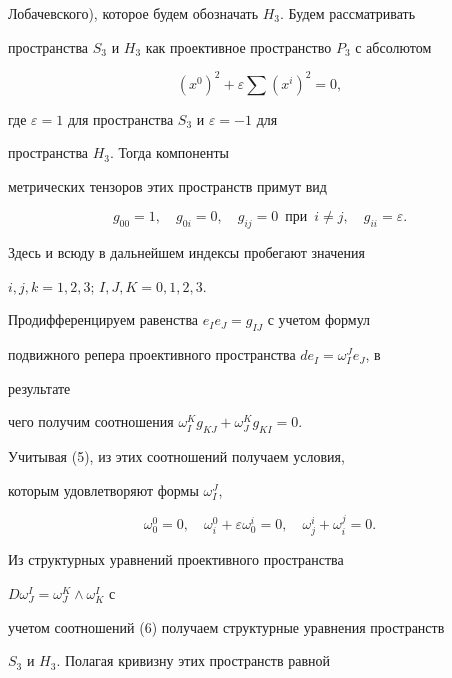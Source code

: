 Лобачевского), которое будем обозначать $H_3$. Будем рассматривать 


пространства $S_3$ и $H_3$ как проективное пространство $P_3$ с абсолютом 


$$ 


(x^0)^2+\varepsilon\sum(x^i)^2=0, 


$$ 


где $\varepsilon=1$ для пространства $S_3$ и $\varepsilon=-1$ для 


пространства $H_3$. Тогда компоненты 


метрических тензоров этих пространств примут вид


\begin{equation} 


g_{00}=1,\quad g_{0i}=0,\quad 


g_{i j}=0\ \;\text{при}\ \; i\ne j,\quad 


g_{i i}=\varepsilon. 


\end{equation} 


Здесь и всюду в дальнейшем индексы пробегают значения


$i,j,k=1,2,3$; $I,J,K=0,1,2,3$. 


 


Продифференцируем равенства $e_I e_J=g_{I J}$ с учетом формул 


подвижного репера проективного пространства $d e_I=\omega^J_I e_J$, в 


результате 


чего получим соотношения $\omega^K_I g_{K J}+\omega^K_J g_{K I}=0$.


Учитывая (5), из этих соотношений получаем условия, 


которым удовлетворяют формы $\omega^J_I$,


\begin{equation} 


\omega^0_0=0,\quad \omega^0_i+\varepsilon\omega^i_0=0, 


\quad \omega^i_j+\omega^j_i=0. 


\end{equation} 


Из структурных уравнений проективного пространства 


$D\omega^I_J=\omega^K_J\wedge\omega^I_K$ с 


учетом соотношений (6) получаем структурные уравнения пространств 


$S_3$ и $H_3$. Полагая кривизну этих пространств равной 


